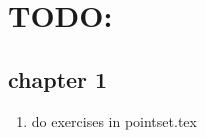 \documentclass{pset}
\begin{document}
\section{TODO:}
\subsection{chapter 1}
\begin{enumerate}
    \item do exercises in pointset.tex
\end{enumerate}
\end{document}
